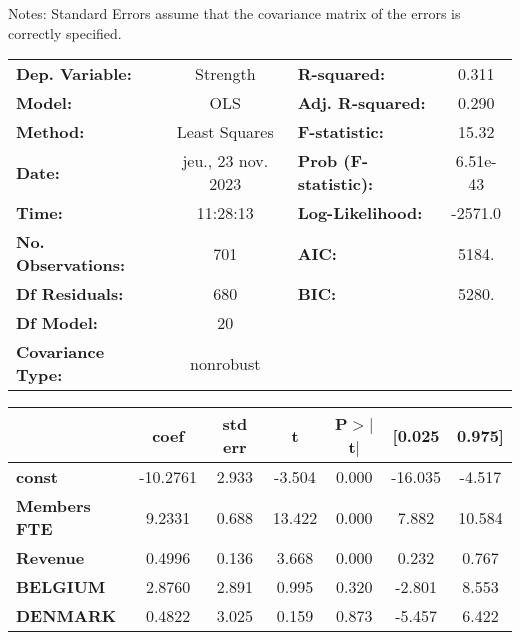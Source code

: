 \documentclass[ 11pt]{article}
\begin{document}
Notes: \newline
 [1] Standard Errors assume that the covariance matrix of the errors is correctly specified.

	\newpage
	\begin{center}
\begin{tabular}{lclc}
\toprule
\textbf{Dep. Variable:}    &      Strength      & \textbf{  R-squared:         } &     0.311   \\
\textbf{Model:}            &        OLS         & \textbf{  Adj. R-squared:    } &     0.290   \\
\textbf{Method:}           &   Least Squares    & \textbf{  F-statistic:       } &     15.32   \\
\textbf{Date:}             & jeu., 23 nov. 2023 & \textbf{  Prob (F-statistic):} &  6.51e-43   \\
\textbf{Time:}             &      11:28:13      & \textbf{  Log-Likelihood:    } &   -2571.0   \\
\textbf{No. Observations:} &          701       & \textbf{  AIC:               } &     5184.   \\
\textbf{Df Residuals:}     &          680       & \textbf{  BIC:               } &     5280.   \\
\textbf{Df Model:}         &           20       & \textbf{                     } &             \\
\textbf{Covariance Type:}  &     nonrobust      & \textbf{                     } &             \\
\bottomrule
\end{tabular}
\begin{tabular}{lcccccc}
                        & \textbf{coef} & \textbf{std err} & \textbf{t} & \textbf{P$> |$t$|$} & \textbf{[0.025} & \textbf{0.975]}  \\
\midrule
\textbf{const}          &     -10.2761  &        2.933     &    -3.504  &         0.000        &      -16.035    &       -4.517     \\
\textbf{Members FTE}    &       9.2331  &        0.688     &    13.422  &         0.000        &        7.882    &       10.584     \\
\textbf{Revenue}        &       0.4996  &        0.136     &     3.668  &         0.000        &        0.232    &        0.767     \\
\textbf{BELGIUM}        &       2.8760  &        2.891     &     0.995  &         0.320        &       -2.801    &        8.553     \\
\textbf{DENMARK}        &       0.4822  &        3.025     &     0.159  &         0.873        &       -5.457    &        6.422     \\

\end{tabular}
\end{center}
\end{document}
